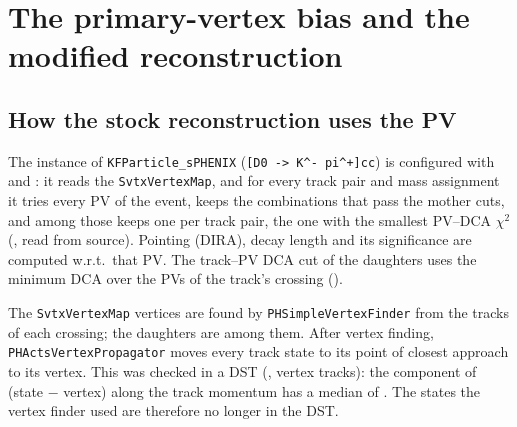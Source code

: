 \section{The primary-vertex bias and the modified reconstruction}
\label{sec:fixes}

\subsection{How the stock reconstruction uses the PV}
The \Dzero{} instance of \texttt{KFParticle\_sPHENIX} (\texttt{[D0 -> K\^{}- pi\^{}+]cc}) is configured with
 and : it reads the \texttt{SvtxVertexMap}, and for
every track pair and mass assignment it tries every PV of the event, keeps the combinations that pass the mother cuts,
and among those keeps one per track pair, the one with the smallest PV--DCA $\chi^2$ (, read
from source). Pointing (DIRA), decay length and its significance are computed w.r.t.\ that PV. The track--PV DCA cut of
the daughters uses the minimum DCA over the PVs of the track's crossing ().

The \texttt{SvtxVertexMap} vertices are found by \texttt{PHSimpleVertexFinder} from the tracks of each crossing; the
\Dzero{} daughters are among them. After vertex finding, \texttt{PHActsVertexPropagator} moves every track state to its
point of closest approach to its vertex. This was checked in a DST (,
\tsVtxTracks{} vertex tracks): the component of (state $-$ vertex) along the track momentum has a median of
\tsAlong\um. The states the vertex finder used are therefore no longer in the DST.

